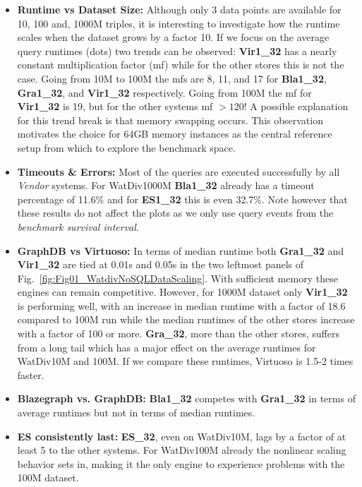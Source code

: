 \begin{itemize}
	\item \textbf{Runtime vs Dataset Size:} Although only 3 data points are available for 10, 100 and, 1000M triples, it is interesting to investigate how the runtime scales when the dataset grows by a factor 10. If we focus on the average query runtimes (dots) two trends can be observed: \textbf{Vir1\_32} has a nearly constant multiplication factor (mf) while for the other stores this is not the case. Going from 10M to 100M the mfs are 8, 11, and 17 for \textbf{Bla1\_32}, \textbf{Gra1\_32}, and \textbf{Vir1\_32} respectively. Going from 100M the mf for \textbf{Vir1\_32} is 19, but for the other systems mf $> 120$! A possible explanation for this trend break is that memory swapping occurs. This observation motivates the choice for 64GB memory instances as the central reference setup from which to explore the benchmark space.
\item \textbf{Timeouts \& Errors:} Most of the queries are executed successfully by all \emph{Vendor} systems. For WatDiv1000M \textbf{Bla1\_32} already has a timeout percentage of 11.6\% and for \textbf{ES1\_32} this is even 32.7\%. Note however that these results do not affect the plots as we only use query events from the \emph{benchmark survival interval}. 
\item \textbf{GraphDB vs Virtuoso:} In terms of median runtime both \textbf{Gra1\_32} and \textbf{Vir1\_32} are tied at 0.01s and 0.05s in the two leftmost panels of Fig.~\ref{fig:Fig01_WatdivNoSQLDataScaling}. With sufficient memory these engines can remain competitive. However, for 1000M dataset only \textbf{Vir1\_32} is performing well, with an increase in median runtime with a factor of 18.6 compared to 100M run while the median runtimes of the other stores increase with a factor of 100 or more. 
\textbf{Gra\_32}, more than the other stores, suffers from a long tail which has a major effect on the average runtimes for WatDiv10M and 100M. If we compare these runtimes, Virtuoso is 1.5-2 times faster.

\item \textbf{Blazegraph vs. GraphDB:} \textbf{Bla1\_32} competes with \textbf{Gra1\_32} in terms of average runtimes but not in terms of median runtimes.

\item \textbf{ES consistently last:} \textbf{ES\_32}, even on WatDiv10M, lags by a factor of at least 5 to the other systems. For WatDiv100M already the nonlinear scaling behavior sets in, making it the only engine to experience problems with the 100M dataset. 
\end{itemize}
%

